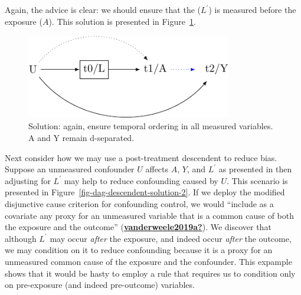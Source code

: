 \documentclass[
  singlecolumn]{report}
\begin{document}
Again, the advice is clear: we should ensure that the (\(L^\prime\)) is
measured before the exposure (\(A\)). This solution is presented in
Figure~\ref{fig-dag-descendent-solution}.

\begin{figure}

{\centering \includegraphics[width=0.8\textwidth,height=\textheight]{causal-dags_files/figure-pdf/fig-dag-descendent-solution-1.pdf}

}

\caption{\label{fig-dag-descendent-solution}Solution: again, ensure
temporal ordering in all measured variables. A and Y remain
d-separated.}

\end{figure}

Next consider how we may use a post-treatment descendent to reduce bias.
Suppose an unmeasured confounder \(U\) affects \(A\), \(Y\), and
\(L^\prime\) as presented in then adjusting for \(L^\prime\) may help to
reduce confounding caused by \(U\). This scenario is presented in
Figure~\ref{fig-dag-descendent-solution-2}. If we deploy the modified
disjunctive cause criterion for confounding control, we would ``include
as a covariate any proxy for an unmeasured variable that is a common
cause of both the exposure and the outcome''
(\protect\hyperlink{ref-vanderweele2019a}{\textbf{vanderweele2019a?}}).
We discover that although \(L^\prime\) may occur \emph{after} the
exposure, and indeed occur \emph{after} the outcome, we may condition on
it to reduce confounding because it is a proxy for an unmeasured common
cause of the exposure and the confounder. This expample shows that it
would be hasty to employ a rule that requires us to condition only on
pre-exposure (and indeed pre-outcome) variables.
\end{document}
